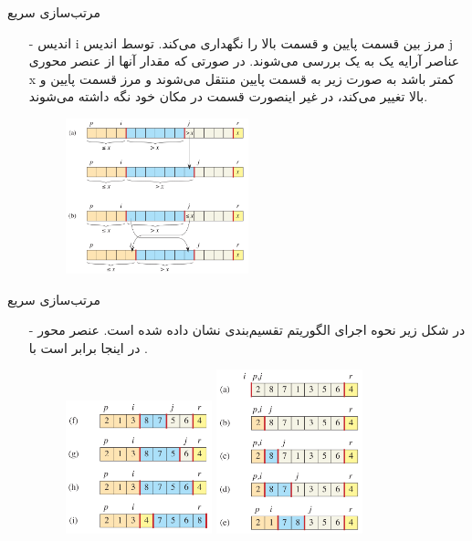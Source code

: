 \begin{frame}{‌مرتب‌سازی سریع}
\begin{itemize}\itemr
\item[-]
اندیس i مرز بین قسمت پایین و قسمت بالا را نگهداری می‌کند. توسط اندیس j عناصر آرایه یک به یک بررسی می‌شوند. در صورتی که مقدار آنها از عنصر محوری x کمتر باشد به صورت زیر به قسمت پایین منتقل می‌شوند و مرز قسمت پایین و بالا تغییر می‌کند، در غیر اینصورت قسمت در مکان خود نگه داشته می‌شوند.
\begin{figure}
\includegraphics[width=0.5\textwidth]{figs/chap03/quicksort2}
\end{figure}
\end{itemize}
\end{frame}


\begin{frame}{‌مرتب‌سازی سریع}
\begin{itemize}\itemr
\item[-]
در شکل زیر نحوه اجرای الگوریتم تقسیم‌بندی نشان داده شده است. عنصر محور در اینجا برابر است با
.
\begin{figure}
\includegraphics[width=0.4\textwidth]{figs/chap03/partition2}
\includegraphics[width=0.4\textwidth]{figs/chap03/partition1}
\end{figure}
\end{itemize}
\end{frame}



